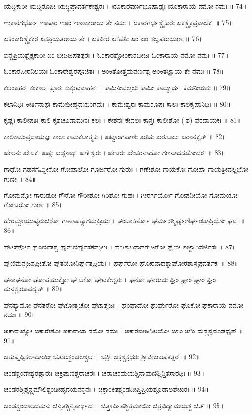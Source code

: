 ಋದ್ಧಿಕಾರೀ ಋದ್ಧಿರೂಪೀ ಋದ್ಧಿಪ್ರಾವರ್ತಕೇಶ್ವರಃ ।
ೠಕಾರವರ್ಣಭೂಷಾಢ್ಯಃ ೠಕಾರಾಯ ನಮೋ ನಮಃ ॥ 74॥

ಌಕಾರಗರ್ಭೋ ೡಕಾರ ೡಂ ೡಂಕಾರಾಯ ತೇ ನಮಃ ।
ಏಕಾರಗರ್ಭಶ್ಚೈಕಾರಃ ಏಕಶ್ಚೈಕಪ್ರವಾಚಕಃ ॥ 75॥

ಏಕಂಕಾರಿಶ್ಚೈಕಕರ ಏಕಪ್ರಿಯತರಾಯ ತೇ ।
ಏಕವೀರ ಏಕಪತಿಃ ಏಂ ಐಂ ಶಬ್ದಪರಾಯಣಃ ॥ 76॥

ಐನ್ದ್ರಪ್ರಿಯಶ್ಚೈಕ್ಯಕಾರೀ ಐಂ ಬೀಜಜಪತತ್ಪರಃ ।
ಓಂಕಾರಶ್ಚೋಂಕಾರಬೀಜಃ ಓಂಕಾರಾಯ ನಮೋ ನಮಃ ॥ 77॥

ಓಂಕಾರಪೀಠನಿಲಯಃ ಓಂಕಾರೇಶ್ವರಪೂಜಿತಃ ।
ಅಂಕಿತೋತ್ತಮವರ್ಣಶ್ಚ ಅಂಕಿತಜ್ಞಾಯ ತೇ ನಮಃ ॥ 78॥

ಕಲಂಕಹರಃ ಕಂಕಾಲಃ ಕ್ರೂರಃ ಕುಕ್ಕುಟವಾಹನಃ ।
ಕಾಮಿನೀವಲ್ಲಭಃ ಕಾಮೀ ಕಾಮ್ಯಾರ್ಥಃ ಕಮನೀಯಕಃ ॥ 79॥

ಕಲಾನಿಧಿಃ ಕೀರ್ತಿನಾಥಃ ಕಾಮೇಶೀಹೃದಯಂಗಮಃ ।
ಕಾಮೇಶ್ವರಃ ಕಾಮರೂಪಃ ಕಾಲಃ ಕಾಲಕೃಪಾನಿಧಿಃ ॥ 80॥

ಕೃಷ್ಣಃ ಕಾಲೀಪತಿಃ ಕಾಲಿ ಕೃಶಚೂಡಾಮಣಿಃ ಕಲಃ ।
ಕೇಶವಃ ಕೇವಲಃ ಕಾನ್ತಃ ಕಾಲೀಶೋ ( ಶ) ವರದಾಯಕಃ ॥ 81॥

ಕಾಲಿಕಾಸಂಪ್ರದಾಯಜ್ಞಃ ಕಾಲಃ ಕಾಮಕಲಾತ್ಮಕಃ ।
ಖಟ್ವಾಂಗಪಾಣಿಃ ಖತಿತಃ ಖರಶೂಲಃ ಖರಾನ್ತಕೃತ್ ॥ 82॥

ಖೇಲನಃ ಖೇಟಕಃ ಖಡ್ಗಃ ಖಡ್ಗನಾಥಃ ಖಗೇಶ್ವರಃ ।
ಖೇಚರಃ ಖೇಚರನಾಥೋ ಗಣನಾಥಸಹೋದರಃ ॥ 83॥

ಗಾಢೋ ಗಹನಗಮ್ಭೀರೋ ಗೋಪಾಲೋ ಗೂರ್ಜರೋ ಗುರುಃ ।
ಗಣೇಶೋ ಗಾಯಕೋ ಗೋಪ್ತಾ ಗಾಯತ್ರೀವಲ್ಲಭೋ ಗುಣೀ ॥ 84॥

ಗೋಮನ್ತೋ ಗಾರುಡೋ ಗೌರೋ ಗೌರೀಶೋ ಗಿರಿಶೋ ಗುಹಃ ।
ಗೀರರ್ಗರ್ಯೋ ಗೋಪನೀಯೋ ಗೋಮಯೋ ಗೋಚರೋ ಗುಣಃ ॥ 85॥

ಹೇರಮ್ಬಾಯುಷ್ಯರುಚಿರೋ ಗಾಣಾಪತ್ಯಾಗಮಪ್ರಿಯಃ ।
ಘಂಟಾಕರ್ಣೋ ಘರ್ಮರಶ್ಮಿರ್ಘೃಣಿರ್ಘಂಟಾಪ್ರಿಯೋ ಘಟಃ ॥ 86॥

ಘಟಸರ್ಪೋ ಘೂರ್ಣಿತಶ್ಚ ಘೃಮಣಿರ್ಘೃತಕಮ್ಬಲಃ ।
ಘಂಟಾದಿನಾದರುಚಿರೋ ಘೃಣೀ ಲಜ್ಜಾವಿವರ್ಜಿತಃ ॥ 87॥

ಘೃಣಿಮನ್ತ್ರಜಪಪ್ರೀತೋ ಘೃತಯೋನಿರ್ಘೃತಪ್ರಿಯಃ ।
ಘರ್ಘರೋ ಘೋರನಾದಶ್ಚಾಘೋರಶಾಸ್ತ್ರಪ್ರವರ್ತಕಃ ॥ 88॥

ಘನಾಘನೋ ಘೋಷಯುಕ್ತೋ ಘೇಟಕೋ ಘೇಟಕೇಶ್ವರಃ ।
ಘನೋ ಘನರುಚಿಃ ಘ್ರಿಂ ಘ್ರಾಂ ಘ್ರಾಂ ಘ್ರಿಂ ಮನ್ತ್ರಸ್ವರೂಪಧೃತ್ ॥ 89॥

ಘನಶ್ಯಾಮೋ ಘನತರೋ ಘಟೋತ್ಕಚೋ ಘಟಾತ್ಮಜಃ ।
ಘಂಘಾದೋ ಘುರ್ಘುರೋ ಘೂಕೋ ಘಕಾರಾಯ ನಮೋ ನಮಃ ॥ 90॥

ಙಕಾರಾಖ್ಯೋ ಙಕಾರೇಶೋ ಙಕಾರಾಯ ನಮೋ ನಮಃ ।
ಙಕಾರಬೀಜನಿಲಯೋ ಙಾಂ ಙಿಂ ಮನ್ತ್ರಸ್ವರೂಪಧೃತ್ ॥ 91॥

ಚತುಷ್ಷಷ್ಟಿಕಲಾದಾಯೀ ಚತುರಶ್ಚಂಚಲಶ್ಚಲಃ ।
ಚಕ್ರೀ ಚಕ್ರಶ್ಚಕ್ರಧರಃ ಶ್ರೀಬೀಜಜಪತತ್ಪರಃ ॥ 92॥

ಚಂಡಶ್ಚಂಡೇಶ್ವರಶ್ಚಾರುಃ ಚಕ್ರಪಾಣಿಶ್ಚರಾಚರಃ ।
ಚರಾಚರಮಯಶ್ಚಿನ್ತಾಮಣಿಶ್ಚಿನ್ತಿತಸಾರಥಿಃ ॥ 93॥

ಚಂಡರಶ್ಮಿಶ್ಚನ್ದ್ರಮೌಲಿಶ್ಚಂಡೀಹೃದಯನನ್ದನಃ ।
ಚಕ್ರಾಂಕಿತಶ್ಚಂಡದೀಪ್ತಿಪ್ರಿಯಶ್ಚೂಡಾಲಶೇಖರಃ ॥ 94॥

ಚಂಡಶ್ಚಂಡಾಲದಮನಃ ಚಿನ್ತಿತಶ್ಚಿನ್ತಿತಾರ್ಥದಃ ।
ಚಿತ್ತಾರ್ಪಿತಶ್ಚಿತ್ತಮಾಯೀ ಚಿತ್ರವಿದ್ಯಾಮಯಶ್ಚ ಚಿತ್ ॥ 95॥

